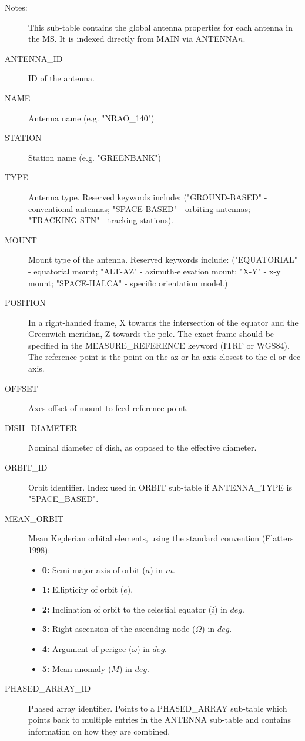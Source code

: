 \documentclass{article}
\begin{document}
\begin{description}

\item[Notes:] This sub-table contains the global antenna properties
for each antenna in the MS. It is indexed directly from MAIN via
ANTENNA$n$.
\item[ANTENNA\_ID] ID of the antenna.

\item[NAME] Antenna name (e.g. "NRAO\_140")

\item[STATION] Station name (e.g. "GREENBANK")

\item[TYPE] Antenna type. Reserved keywords include:
("GROUND-BASED" - conventional antennas; "SPACE-BASED" - orbiting
antennas; "TRACKING-STN" - tracking stations).

\item[MOUNT] Mount type of the antenna. Reserved keywords include:
("EQUATORIAL" - equatorial mount; "ALT-AZ" - azimuth-elevation mount; "X-Y"
- x-y mount; "SPACE-HALCA" - specific orientation model.)

\item[POSITION] In a right-handed frame, X towards the intersection of
the equator and the Greenwich meridian, Z towards the pole. The exact
frame should be specified in the MEASURE\_REFERENCE keyword (ITRF or
WGS84). The reference point is the point on the az or ha axis closest
to the el or dec axis.

\item[OFFSET] Axes offset of mount to feed reference point.

\item[DISH\_DIAMETER] Nominal diameter of dish, as opposed to the
effective diameter.

\item[ORBIT\_ID] Orbit identifier. Index used in ORBIT sub-table if
ANTENNA\_TYPE is "SPACE\_BASED".

\item[MEAN\_ORBIT] Mean Keplerian orbital elements, using the
standard convention (Flatters 1998): 
\begin{itemize}
   \item{{\bf 0:} Semi-major axis of orbit ($a$) in $m$.}
   \item{{\bf 1:} Ellipticity of orbit ($e$).}
   \item{{\bf 2:} Inclination of orbit to the celestial equator ($i$) 
                  in $deg.$}
   \item{{\bf 3:} Right ascension of the ascending node ($\Omega$) in $deg.$}
   \item{{\bf 4:} Argument of perigee ($\omega$) in $deg.$}
   \item{{\bf 5:} Mean anomaly ($M$) in $deg.$}
\end{itemize}

\item[PHASED\_ARRAY\_ID] Phased array identifier. Points to a
PHASED\_ARRAY sub-table which points back to multiple entries in the
ANTENNA sub-table and contains information on how they are combined.

\end{description}
\end{document}
